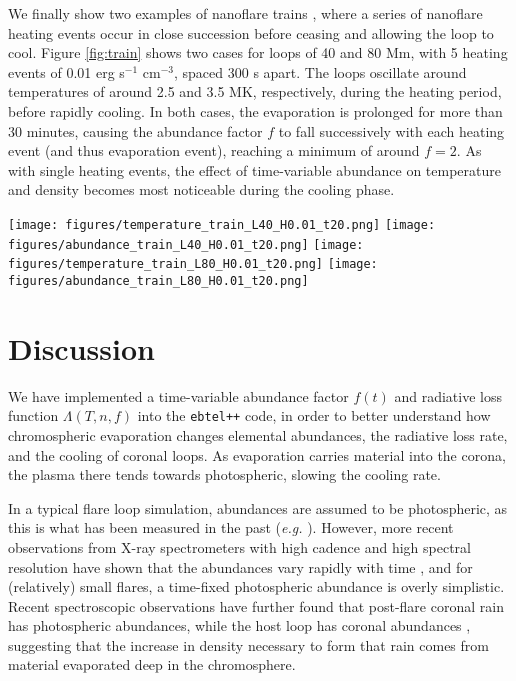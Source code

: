 \documentclass[twocolumn]{aastex631}
\begin{document}
We finally show two examples of nanoflare trains \citep{reep2013,cargill2014,barnes2016b}, where a series of nanoflare heating events occur in close succession before ceasing and allowing the loop to cool.  Figure \ref{fig:train} shows two cases for loops of 40 and 80 Mm, with 5 heating events of 0.01 erg s$^{-1}$ cm$^{-3}$, spaced 300 s apart.  The loops oscillate around temperatures of around 2.5 and 3.5 MK, respectively, during the heating period, before rapidly cooling.  In both cases, the evaporation is prolonged for more than 30 minutes, causing the abundance factor $f$ to fall successively with each heating event (and thus evaporation event), reaching a minimum of around $f=2$.  As with single heating events, the effect of time-variable abundance on temperature and density becomes most noticeable during the cooling phase.
\begin{figure*}
    \centering
    \texttt{[image: figures/temperature\_train\_L40\_H0.01\_t20.png]}
    \texttt{[image: figures/abundance\_train\_L40\_H0.01\_t20.png]}
    \texttt{[image: figures/temperature\_train\_L80\_H0.01\_t20.png]}
    \texttt{[image: figures/abundance\_train\_L80\_H0.01\_t20.png]}
    \caption{Two examples of nanoflare trains, with 5 heating events spaced 300 s apart, for loops of 40 and 80 Mm.  The abundance factor $f$ falls with each successive heating event. \label{fig:train}}
\end{figure*}

\section{Discussion}

We have implemented a time-variable abundance factor $f(t)$ and radiative loss function $\Lambda(T, n, f)$ into the \texttt{ebtel++} code, in order to better understand how chromospheric evaporation changes elemental abundances, the radiative loss rate, and the cooling of coronal loops.  As evaporation carries material into the corona, the plasma there tends towards photospheric, slowing the cooling rate.  

In a typical flare loop simulation, abundances are assumed to be photospheric, as this is what has been measured in the past (\textit{e.g.} \citealt{warren2014}).  However, more recent observations from X-ray spectrometers with high cadence and high spectral resolution have shown that the abundances vary rapidly with time \citep{mondal2021}, and for (relatively) small flares, a time-fixed photospheric abundance is overly simplistic.  Recent spectroscopic observations have further found that post-flare coronal rain has photospheric abundances, while the host loop has coronal abundances \citep{brooks2024}, suggesting that the increase in density necessary to form that rain comes from material evaporated deep in the chromosphere.  
\end{document}
